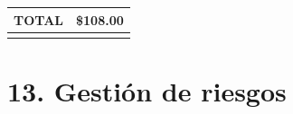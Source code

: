 \documentclass[
11pt, %
]{charter}
\begin{document}
\begin{table}[htpb]
\begin{tabularx}{\linewidth}{@{}|X|c|r|r|@{}}
\multicolumn{3}{|c|}{TOTAL} &
  \multicolumn{1}{c|}{\$108.00} \\ \hline
\rowcolor[HTML]{C0C0C0} 
\end{tabularx}%
\end{table}




\section{13. Gestión de riesgos}
\label{sec:riesgos}
\end{document}
